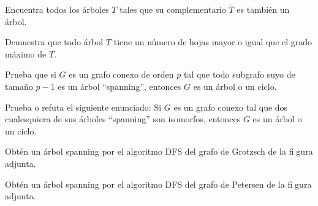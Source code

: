 \documentclass[twoside]{article}
\begin{document}
\newpage

\begin{ejercicio}{1.4}

Encuentra todos los árboles $T$ tales que su complementario $\overline{T}$ es también un árbol.
\end{ejercicio}
\begin{solucion}

\end{solucion}

\newpage

\begin{ejercicio}{1.5}

Demuestra que todo árbol $T$ tiene un número de hojas mayor o igual que el grado máximo
de $T$.
\end{ejercicio}
\begin{solucion}

\end{solucion}

\newpage

\begin{ejercicio}{1.6}
Prueba que si $G$ es un grafo conexo de orden $p$ tal que todo subgrafo suyo de tamaño
$p -1$ es un árbol ``spanning'', entonces $G$ es un árbol o un ciclo.
\end{ejercicio}
\begin{solucion}
\end{solucion}

\newpage

\begin{ejercicio}{1.7}
Prueba o refuta el siguiente enunciado: Si $G$ es un grafo conexo tal que dos cualesquiera
de sus árboles ``spanning'' son isomorfos, entonces $G$ es un árbol o un ciclo.
\end{ejercicio}
\begin{solucion}

\end{solucion}

\newpage

\begin{ejercicio}{1.8}
Obtén un árbol spanning por el algoritmo DFS del grafo de Grotzsch de la figura adjunta.
\end{ejercicio}
\begin{solucion}





\end{solucion}
\newpage

\begin{ejercicio}{1.9}
Obtén un árbol spanning por el algoritmo DFS del grafo de Petersen de la figura adjunta.
\end{ejercicio}
\begin{solucion}

\end{solucion}
\newpage
\end{document}
